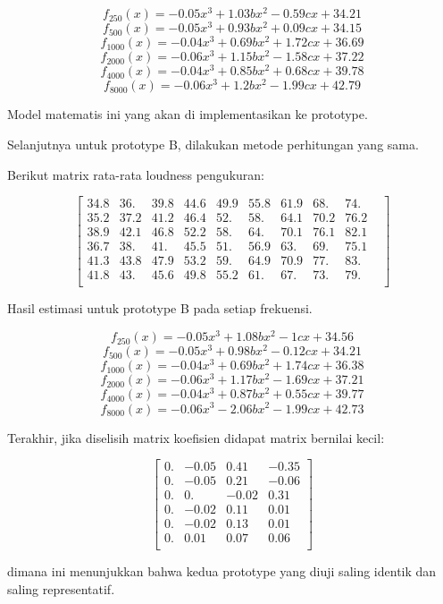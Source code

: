 \documentclass[12pt,]{article}
\begin{document}
\begin{itemize}
		\[f_{250}(x) = -0.05x^3 + 1.03bx^2 - 0.59cx + 34.21\]
		\[f_{500}(x) = -0.05x^3 + 0.93bx^2 + 0.09cx + 34.15\]
		\[f_{1000}(x) = -0.04x^3 + 0.69bx^2 + 1.72cx + 36.69\]
		\[f_{2000}(x) = -0.06x^3 + 1.15bx^2 - 1.58cx + 37.22\]
		\[f_{4000}(x) = -0.04x^3 + 0.85bx^2 + 0.68cx + 39.78\]
		\[f_{8000}(x) = -0.06x^3 + 1.2bx^2 - 1.99cx + 42.79\]

		Model matematis ini yang akan di implementasikan ke prototype.

		\newpage
		Selanjutnya untuk prototype B, dilakukan metode perhitungan yang sama.

		Berikut matrix rata-rata loudness pengukuran:

		\[\left[
		\begin{matrix}
			34.8&36.&39.8&44.6&49.9&55.8&61.9&68.&74.&\\

			35.2&37.2&41.2&46.4&52.&58.&64.1&70.2&76.2\\

			38.9&42.1&46.8&52.2&58.&64.&70.1&76.1&82.1\\

			36.7&38.&41.&45.5&51.&56.9&63.&69.&75.1\\

			41.3&43.8&47.9&53.2&59.&64.9&70.9&77.&83.&\\

			41.8&43.&45.6&49.8&55.2&61.&67.&73.&79.&\\
		\end{matrix}
		\right]\]

		Hasil estimasi untuk prototype B pada setiap frekuensi.

		\[f_{250}(x) = -0.05x^3 + 1.08bx^2 - 1cx + 34.56\]
		\[f_{500}(x) = -0.05x^3 + 0.98bx^2 - 0.12cx + 34.21\]
		\[f_{1000}(x) = -0.04x^3 + 0.69bx^2 + 1.74cx + 36.38\]
		\[f_{2000}(x) = -0.06x^3 + 1.17bx^2 - 1.69cx + 37.21\]
		\[f_{4000}(x) = -0.04x^3 + 0.87bx^2 + 0.55cx + 39.77\]
		\[f_{8000}(x) = -0.06x^3 - 2.06bx^2 - 1.99cx + 42.73\]

		Terakhir, jika diselisih matrix koefisien didapat matrix bernilai kecil:

		\[\left[
		\begin{matrix}
			0.  & -0.05 &  0.41 & -0.35\\
			0.  & -0.05 &  0.21 & -0.06\\
			0.  &  0.   & -0.02 &  0.31\\
			0.  & -0.02 &  0.11 &  0.01\\
			0.  & -0.02 &  0.13 &  0.01\\
			0.  &  0.01 &  0.07 &  0.06\\
		\end{matrix}
		\right]\]

		dimana ini menunjukkan bahwa kedua prototype yang diuji saling identik dan saling representatif.
	\end{itemize}
\end{document}
